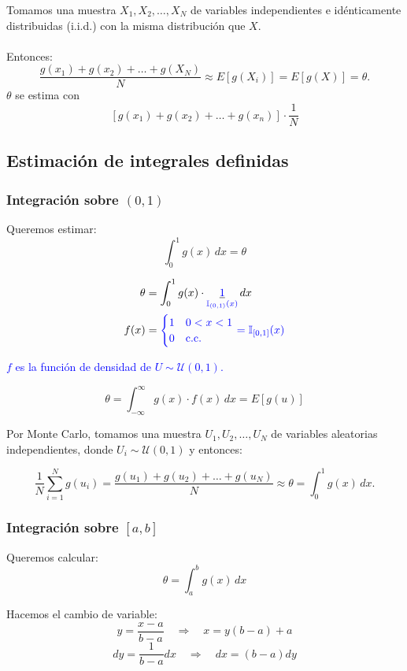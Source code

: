 \documentclass[11pt, a4paper]{article}
\theoremstyle{definition}
\begin{document}
Tomamos una muestra $X_1, X_2, \ldots, X_N$ de variables independientes e idénticamente distribuidas (i.i.d.) con la misma distribución que $X$.
\\ \\
Entonces:
\[
\frac{g(x_1) + g(x_2) + \ldots + g(X_N)}{N} \approx E[g(X_i)] = E[g(X)] = \theta. 
\]
$\theta$ se estima con \[ [g(x_1) + g(x_2) + \ldots + g(x_n)] \cdot \frac{1}{N} \] 
\subsection{Estimación de integrales definidas}

\subsubsection{Integración sobre $(0,1)$}

Queremos estimar:
\[
\int_{0}^{1} g(x) \, dx = \theta
\]

\begin{align*}
\theta &= \int_0^1 g(x) \cdot 
\underset{\textcolor{blue}{\mathbb{I}_{(0,1)}(x)}}
         {\underline{\textcolor{blue}{1}}} \, dx \\
f(x) &= 
\textcolor{blue}{
\begin{cases} 
1 & 0 < x < 1 \\ 
0 & \text{c.c.}
\end{cases}
= \mathbb{I}_{[0,1]}(x)
}
\end{align*}

\textcolor{blue}{$f$ es la función de densidad de $U \sim \mathcal{U}(0,1)$.}

\[
\theta = \int_{-\infty}^{\infty} g(x) \cdot f(x) \, dx = E[g(u)]
\]

Por Monte Carlo, tomamos una muestra $U_1, U_2, \ldots, U_N$ de variables aleatorias independientes, donde $U_i \sim \mathcal{U}(0,1)$ y entonces:

\[
\frac{1}{N} \sum_{i=1}^{N} g(u_i) = \frac{g(u_1) + g(u_2) + \ldots + g(u_N)}{N} \approx \theta = \int_{0}^{1} g(x) \, dx.
\]

\subsubsection{Integración sobre $[a,b]$}

Queremos calcular:
\[
\theta = \int_{a}^{b} g(x) \, dx
\]

Hacemos el cambio de variable:
\[
y = \frac{x - a}{b - a} \quad \Rightarrow \quad x = y(b - a) + a
\]
\[
dy = \frac{1}{b - a}dx \quad \Rightarrow \quad dx = (b - a)dy
\]
\end{document}
